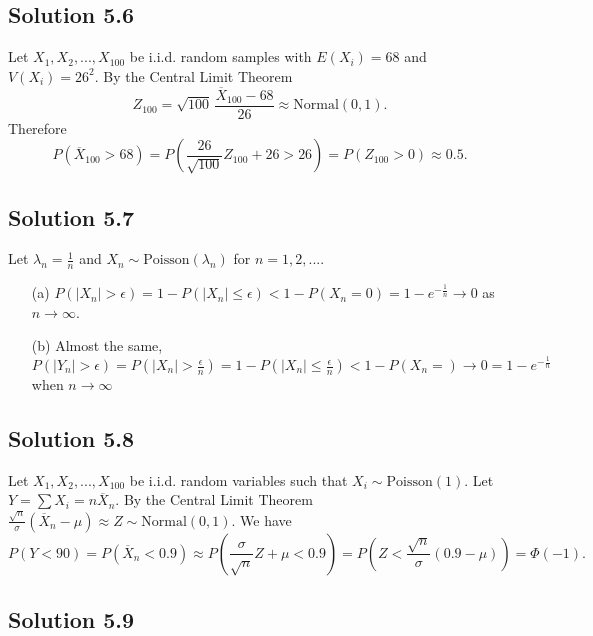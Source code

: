 \subsection*{Solution 5.6}

Let $X_1, X_2, ..., X_{100}$ be i.i.d. random samples with $E(X_i) = 68$ and $V(X_i) = 26^2$.
By the Central Limit Theorem
\begin{equation*}
    Z_{100} = \sqrt{100}\, \frac{\overline{X}_{100} - 68}{26} \approx \mathrm{Normal}(0, 1).
\end{equation*}
Therefore
\begin{equation*}
    P(\overline{X}_{100} > 68) = P\left(\frac{26}{\sqrt{100}} Z_{100} + 26 > 26\right)
        = P(Z_{100} > 0)
        \approx 0.5.
\end{equation*}


\subsection*{Solution 5.7}

Let $\lambda_n = \frac{1}{n}$ and $X_n \sim \mathrm{Poisson}(\lambda_n)$ for $n = 1, 2, ...$.
\begin{itemize}
    \item[(a)] $P(|X_n| > \epsilon) = 1 - P(|X_n| \leq \epsilon) < 1 - P(X_n = 0) = 1 - e^{-\frac{1}{n}} \to 0$ as $n \to \infty$.
    \item[(b)] Almost the same, $P(|Y_n| > \epsilon) = P(|X_n| > \frac{\epsilon}{n}) = 1 - P(|X_n| \leq \frac{\epsilon}{n}) < 1 - P(X_n = ) \to 0 = 1 - e^{-\frac{1}{n}}$ when $n \to \infty$
\end{itemize}


\subsection*{Solution 5.8}

Let $X_1, X_2, ..., X_{100}$ be i.i.d. random variables such that $X_i \sim \mathrm{Poisson}(1)$.
Let $Y = \sum X_i = n \overline{X}_n$.
By the Central Limit Theorem $\frac{\sqrt{n}}{\sigma} (\overline{X}_n - \mu) \approx Z \sim \mathrm{Normal}(0, 1)$.
We have
\begin{equation*}
    P(Y < 90) = P(\overline{X}_n < 0.9)
        \approx P(\frac{\sigma}{\sqrt{n}} Z + \mu < 0.9)
        = P(Z < \frac{\sqrt{n}}{\sigma} (0.9 - \mu))
        = \Phi(-1).
\end{equation*}


\subsection*{Solution 5.9}

